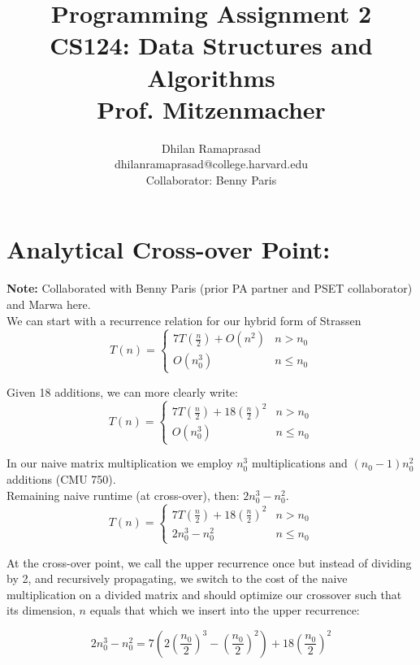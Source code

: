 \documentclass[conference]{styles/acmsiggraph}
\title{\huge Programming Assignment 2 \\ \LARGE {CS124: Data Structures and Algorithms \\ Prof. Mitzenmacher}}
\author{\Large Dhilan Ramaprasad \\
dhilanramaprasad@college.harvard.edu \\
Collaborator: Benny Paris}
\newcommand{\?}{\stackrel{?}{=}}
\begin{document}
\maketitle

\section{Analytical Cross-over Point:} \label{section:Math}
\textbf{Note:} Collaborated with Benny Paris (prior PA partner and PSET collaborator) and Marwa here. \\

We can start with a recurrence relation for our hybrid form of Strassen
\begin{equation}
  T(n)=\begin{cases}
    7T(\frac{n}{2}) + O(n^2) & n > n_0\\
    O(n_0^3) & n\leq n_0
  \end{cases}
\end{equation}

Given 18 additions, we can more clearly write:
\begin{equation}
  T(n)=\begin{cases}
    7T(\frac{n}{2}) + 18(\frac{n}{2})^2 & n > n_0\\
    O(n_0^3) & n\leq n_0
  \end{cases}
\end{equation}

In our naive matrix multiplication we employ $n_0^3$ multiplications and $(n_0-1)n_0^2$ additions (CMU 750).\\

Remaining naive runtime (at cross-over), then: $2n_0^3 - n_0^2$. \\

\begin{equation}
  T(n)=\begin{cases}
    7T(\frac{n}{2}) + 18(\frac{n}{2})^2 & n > n_0\\
    2n_0^3 - n_0^2 & n\leq n_0
  \end{cases}
\end{equation}

At the cross-over point, we call the upper recurrence once but instead of dividing by 2, and recursively propagating, we switch to the cost of the naive multiplication on a divided matrix and should optimize our crossover such that its dimension, $n$ equals that which we insert into the upper recurrence:

$$2n_0^3 - n_0^2 = 7\left ( 2\left (\frac{n_0}{2}\right )^3 - \left (\frac{n_0}{2}\right )^2\right ) + 18\left (\frac{n_0}{2} \right )^2 $$
\end{document}
